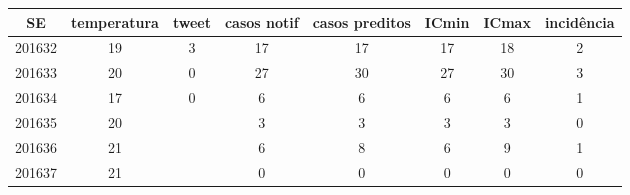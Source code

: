 \begin{tabular}{c|ccccccc}
  \hline
SE & temperatura & tweet & casos notif & casos preditos & ICmin & ICmax & incidência \\ 
  \hline
201632 & 19 & 3 & 17 & 17 & 17 & 18 & 2 \\ 
  201633 & 20 & 0 & 27 & 30 & 27 & 30 & 3 \\ 
  201634 & 17 & 0 & 6 & 6 & 6 & 6 & 1 \\ 
  201635 & 20 &  & 3 & 3 & 3 & 3 & 0 \\ 
  201636 & 21 &  & 6 & 8 & 6 & 9 & 1 \\ 
  201637 & 21 &  & 0 & 0 & 0 & 0 & 0 \\ 
   \hline
\end{tabular}
